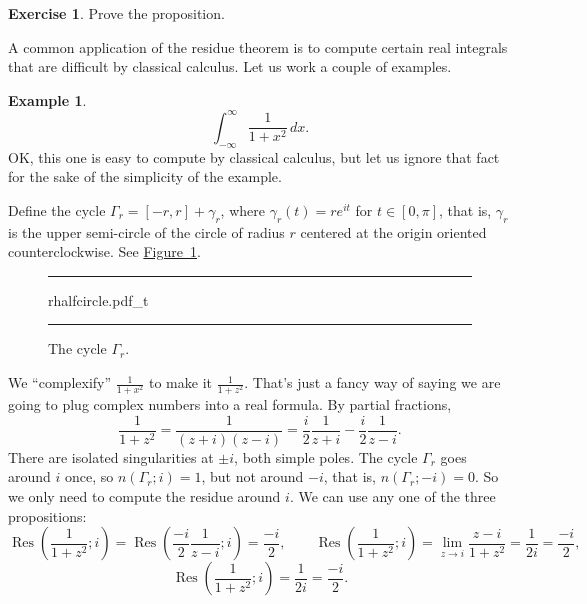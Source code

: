\documentclass[12pt,openany]{book}
\newcommand{\myquote}[1]{``#1''}
\theoremstyle{plain}
\theoremstyle{remark}
\theoremstyle{definition}
\newenvironment{exbox}{%
    \def\FrameCommand{\vrule width 1pt \relax\hspace{10pt}}%
    \MakeFramed{\advance\hsize-\width\FrameRestore}%
}{%
    \endMakeFramed
}
\newenvironment{myfig}{%
\begin{figure}[h!t]
\noindent\rule{\textwidth}{0.5pt}\vspace{12pt}\par\centering}%
{\par\noindent\rule{\textwidth}{0.5pt}
\end{figure}}
\theoremstyle{exercise}
\newtheorem{exercise}{Exercise}[section]
\theoremstyle{example}
\newtheorem{example}[thm]{Example}
\newcommand{\figureref}[1]{\hyperref[#1]{Figure~\ref*{#1}}}
\begin{document}
\begin{exbox}
\begin{exercise}
Prove the proposition.
\end{exercise}
\end{exbox}

A common application of the residue theorem is to compute certain real
integrals that are difficult by classical calculus.  Let us work
a couple of examples.

\begin{example}
\begin{equation*}
\int_{-\infty}^\infty \frac{1}{1+x^2} \, dx .
\end{equation*}
OK\@, this one is easy to compute by classical calculus, but let us ignore
that fact for the sake of the simplicity of the example.

Define the cycle $\Gamma_r = [-r,r] + \gamma_r$, where $\gamma_r(t) =
re^{it}$ for $t \in [0,\pi]$, that is, $\gamma_r$ is the upper semi-circle
of the circle of radius $r$ centered at the origin oriented counterclockwise.
See \figureref{fig:rhalfcircle}.

\begin{myfig}
{rhalfcircle.pdf_t}
\caption{The cycle $\Gamma_r$.\label{fig:rhalfcircle}}
\end{myfig}

We \myquote{complexify}
$\frac{1}{1+x^2}$ to make it $\frac{1}{1+z^2}$.
That's just a fancy way of saying we are going to plug complex numbers
into a real formula.
By partial fractions,
\begin{equation*}
\frac{1}{1+z^2} = \frac{1}{(z+i)(z-i)} =
\frac{i}{2} \frac{1}{z+i} - 
\frac{i}{2} \frac{1}{z-i} .
\end{equation*}
There are isolated singularities at $\pm i$, both simple poles.  The cycle
$\Gamma_r$ goes around $i$ once, so $n(\Gamma_r;i) = 1$,
but not around $-i$, that is, $n(\Gamma_r;-i) = 0$.
So we only need to compute
the residue around $i$.  We can use any one of the three propositions:
\begin{equation*}
\operatorname{Res}\left(\frac{1}{1+z^2};i\right) =
\operatorname{Res}\left(
\frac{-i}{2} \frac{1}{z-i};
i\right) = \frac{-i}{2} ,
\qquad
\operatorname{Res}\left(\frac{1}{1+z^2};i\right) =
\lim_{z \to i} \frac{z-i}{1+z^2}
=
\frac{1}{2i} = \frac{-i}{2},
\end{equation*}
\begin{equation*}
\operatorname{Res}\left(\frac{1}{1+z^2};i\right) =
\frac{1}{2i} =
\frac{-i}{2} .
\end{equation*}


\end{example}
\end{document}
